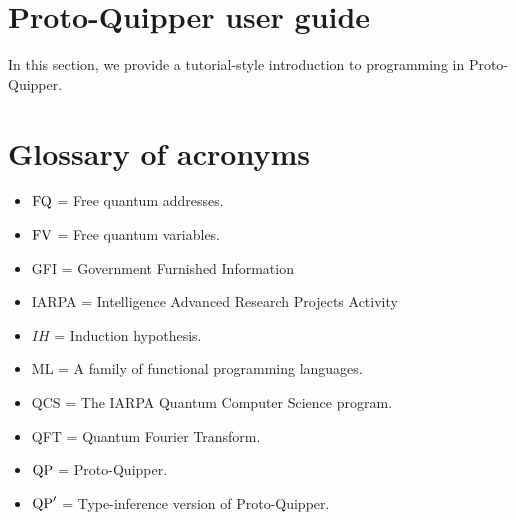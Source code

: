 \documentclass[twoside]{article}
\begin{document}
\clearpage
\section{Proto-Quipper user guide}
\label{sec-user-guide}

In this section, we provide a tutorial-style introduction to 
programming in Proto-Quipper. 



\clearpage
\section*{Glossary of acronyms}

\begin{itemize}
  \item $\mathop{\textrm{FQ}}\nolimits$ = Free quantum addresses.
  \item $\mathop{\textrm{FV}}\nolimits$ = Free quantum variables.
  \item GFI = Government Furnished Information
  \item IARPA = Intelligence Advanced Research Projects Activity
  \item $IH$ = Induction hypothesis.
  \item ML = A family of functional programming languages.
  \item QCS = The IARPA Quantum Computer Science program.
  \item QFT = Quantum Fourier Transform.
  \item ${\rm QP}$ = Proto-Quipper.
  \item ${\rm QP}'$ = Type-inference version of Proto-Quipper.
\end{itemize}

\clearpage

{}

\end{document}
